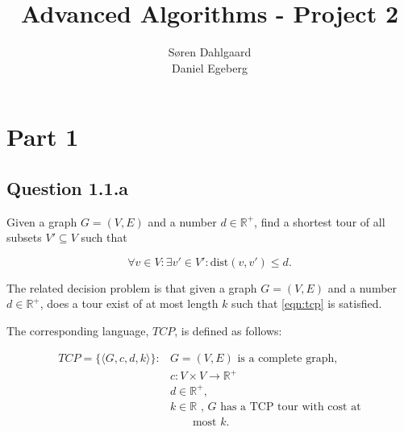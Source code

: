 \documentclass{sig-alternate}
\begin{document}
\title{Advanced Algorithms - Project 2}


\author{
\alignauthor
Søren Dahlgaard\\
\alignauthor
Daniel Egeberg\\
}

\maketitle

\section*{Part 1}
\subsection*{Question 1.1.a}

Given a graph $G=(V,E)$ and a number $d \in \mathbb{R}^+$, find a shortest
tour of all subsets $V'\subseteq V$ such that

\begin{equation}
    \label{eqn:tcp}
    \forall v \in V : \exists v' \in V' : \text{dist}(v,v') \leq d.
\end{equation}

The related decision problem is that given a graph $G=(V,E)$ and a number $d
\in \mathbb{R}^+$, does a tour exist of at most length $k$ such that
\autoref{eqn:tcp} is satisfied.

The corresponding language, $TCP$, is defined as follows:

\begin{align*}
    TCP = \{\langle G, c, d, k \rangle\} :& G = (V,E) \text{ is a complete graph,} \\
        & c : V\times V\to \mathbb{R}^+ \\
        & d \in \mathbb{R}^+, \\
        & k \in \mathbb{R} \text{ , $G$ has a TCP tour with cost at} \\
        & \qquad \text{most $k$.}
\end{align*}
\end{document}
